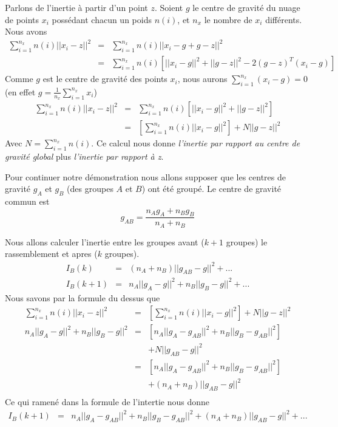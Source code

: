 \documentclass[a4paper, 11pt, onecolumn]{article}
\begin{document}
\begin{enumerate}
\begin{framed}
Parlons de l'inertie à partir d'un point $z$. Soient $g$ le centre de gravité du nuage de points $x_i$ possédant chacun un poids $n(i)$, et $n_x$ le nombre de $x_i$ différents. Nous avons
\begin{eqnarray}
\sum_{i=1}^{n_x} n(i) ||x_i-z||^2 &=& \sum_{i=1}^{n_x} n(i) ||x_i-g+g-z||^2\\
&=&  \sum_{i=1}^{n_x} n(i) \left[||x_i-g||^2 + ||g-z||^2 - 2(g-z)^T(x_i-g)\right]
\end{eqnarray}
Comme $g$ est le centre de gravité des points $x_i$, nous aurons $\sum_{i=1}^{n_x} (x_i-g) = 0$ (en effet $g=\frac{1}{n_x}\sum_{i=1}^{n_x} x_i$)
\begin{eqnarray}
\sum_{i=1}^{n_x} n(i) ||x_i-z||^2 &=& \sum_{i=1}^{n_x} n(i) \left[||x_i-g||^2 + ||g-z||^2\right]\\
&=& \left[\sum_{i=1}^{n_x} n(i) ||x_i-g||^2\right] + N ||g-z||^2
\end{eqnarray}
Avec $N = \sum_{i=1}^{n_x} n(i)$. Ce calcul nous donne \textit{l'inertie par rapport au centre de gravité global} plus \textit{l'inertie par rapport à z}.
\end{framed}

Pour continuer notre démonstration nous allons supposer que les centres de gravité $g_A$ et $g_B$ (des groupes $A$ et $B$) ont été groupé. Le centre de gravité commun est
$$g_{AB}=\frac{n_Ag_A+n_Bg_B}{n_A+n_B}$$
\begin{framed}
Nous allons calculer l'inertie entre les groupes avant ($k+1$ groupes) le rassemblement et apres ($k$ groupes).
\begin{eqnarray}
I_B(k)&=&(n_A+n_B)||g_{AB}-g||^2+...\\
I_B(k+1)&=&n_A||g_A-g||^2+n_B||g_B-g||^2+...
\end{eqnarray}
Nous savons par la formule du dessus que 
\begin{eqnarray}
\sum_{i=1}^{n_x} n(i) ||x_i-z||^2 &=& \left[\sum_{i=1}^{n_x} n(i) ||x_i-g||^2\right] + N ||g-z||^2\\
n_A||g_A-g||^2+n_B||g_B-g||^2 &=& \left[n_A||g_A-g_{AB}||^2+n_B||g_B-g_{AB}||^2\right]\\
&& + N ||g_{AB}-g||^2\\
&=&  \left[n_A||g_A-g_{AB}||^2+n_B||g_B-g_{AB}||^2\right]\\
&& + (n_A+n_B) ||g_{AB}-g||^2\\
\end{eqnarray}
Ce qui ramené dans la formule de l'intertie nous donne
\begin{eqnarray}
I_B(k+1)&=&n_A||g_A-g_{AB}||^2+n_B||g_B-g_{AB}||^2+ (n_A+n_B) ||g_{AB}-g||^2+...
\end{eqnarray}
\end{framed}


\end{enumerate}
\end{document}
